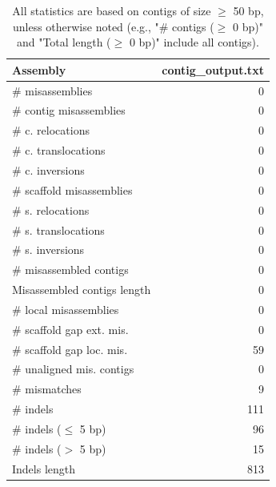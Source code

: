 \documentclass[12pt,a4paper]{article}
\begin{document}
\begin{table}[ht]
\begin{center}
\caption{All statistics are based on contigs of size $\geq$ 50 bp, unless otherwise noted (e.g., "\# contigs ($\geq$ 0 bp)" and "Total length ($\geq$ 0 bp)" include all contigs).}
\begin{tabular}{|l*{1}{|r}|}
\hline
Assembly & contig\_output.txt \\ \hline
\# misassemblies & 0 \\ \hline
\hspace{2mm}\# contig misassemblies & 0 \\ \hline
\hspace{5mm}\# c. relocations & 0 \\ \hline
\hspace{5mm}\# c. translocations & 0 \\ \hline
\hspace{5mm}\# c. inversions & 0 \\ \hline
\hspace{2mm}\# scaffold misassemblies & 0 \\ \hline
\hspace{5mm}\# s. relocations & 0 \\ \hline
\hspace{5mm}\# s. translocations & 0 \\ \hline
\hspace{5mm}\# s. inversions & 0 \\ \hline
\# misassembled contigs & 0 \\ \hline
Misassembled contigs length & 0 \\ \hline
\# local misassemblies & 0 \\ \hline
\# scaffold gap ext. mis. & 0 \\ \hline
\# scaffold gap loc. mis. & 59 \\ \hline
\# unaligned mis. contigs & 0 \\ \hline
\# mismatches & 9 \\ \hline
\# indels & 111 \\ \hline
\hspace{5mm}\# indels ($\leq$ 5 bp) & 96 \\ \hline
\hspace{5mm}\# indels ($>$ 5 bp) & 15 \\ \hline
Indels length & 813 \\ \hline
\end{tabular}
\end{center}
\end{table}
\end{document}
